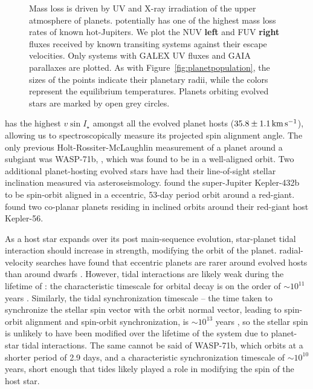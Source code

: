 \documentclass[apjl]{emulateapj}
\newcommand{\kms}{\ensuremath{\rm km\,s^{-1}}}
\newcommand{\vsini}{\ensuremath{v \sin{I_\star}}}
\newcommand{\genevastarvsini}{\ensuremath{35.8\pm1.1}}             %
\begin{document}
\begin{figure*}[!ht]
\caption{
Mass loss is driven by UV and X-ray irradiation of the upper atmosphere of planets. \hatcurb{} potentially has one of the highest mass loss rates of known hot-Jupiters. We plot the NUV \textbf{left} and FUV \textbf{right} fluxes received by known transiting systems against their escape velocities. Only systems with GALEX UV fluxes \citep{Bianchi:2011} and GAIA parallaxes are plotted. As with Figure~\ref{fig:planetpopulation}, the sizes of the points indicate their planetary radii, while the colors represent the equilibrium temperatures. Planets orbiting evolved stars are marked by open grey circles. 
\label{fig:UV}}
\end{figure*}


\hatcur{} has the highest \vsini{} amongst all the evolved planet hosts ($\genevastarvsini\,\kms$), allowing us to spectroscopically measure its projected spin alignment angle. The only previous Holt-Rossiter-McLaughlin measurement of a planet around a subgiant was WASP-71b, \citep{2013A&A...552A.120S}, which was found to be in a well-aligned orbit. Two additional planet-hosting evolved stars have had their line-of-sight stellar inclination measured via asteroseismology. \citet{2015ApJ...803...49Q} found the super-Jupiter Kepler-432b to be spin-orbit aligned in a eccentric, 53-day period orbit around a red-giant. \citet{2013Sci...342..331H} found two co-planar planets residing in inclined orbits around their red-giant host Kepler-56. 


As a host star expands over its post main-sequence evolution, star-planet tidal interaction should increase in strength, modifying the orbit of the planet. radial-velocity searches have found that eccentric planets are rarer around evolved hosts than around dwarfs \citep[e.g.][]{Jones:2014}. However, tidal interactions are likely weak during the lifetime of \hatcurb{}: the characteristic timescale for orbital decay is on the order of $\sim 10^{11}$ years \citep[adopting eq.2 of ][ assuming an effective stellar dissipation coefficient of $\sigma_\star = 10^{-8}$]{Hansen:2012}. Similarly, the tidal synchronization timescale -- the time taken to synchronize the stellar spin vector with the orbit normal vector, leading to spin-orbit alignment and spin-orbit synchronization, is $\sim 10^{13}$ years \citep[eq. 3 of ][]{Hansen:2012}, so the stellar spin is unlikely to have been modified over the lifetime of the system due to planet-star tidal interactions. The same cannot be said of WASP-71b, which orbits at a shorter period of 2.9 days, and a characteristic synchronization timescale of $\sim 10^{10}$ years, short enough that tides likely played a role in modifying the spin of the host star. 
\end{document}
